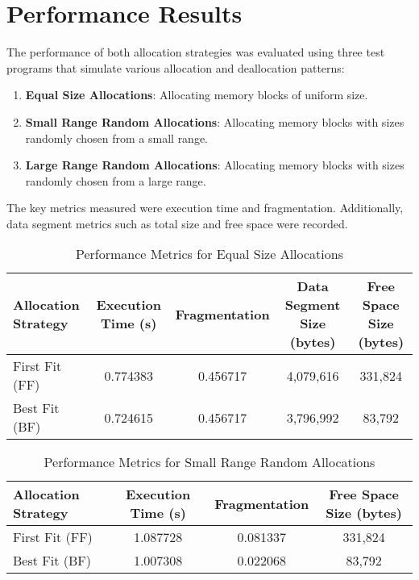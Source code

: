 \documentclass[12pt]{article}
\begin{document}
\section{Performance Results}
The performance of both allocation strategies was evaluated using three test programs that simulate various allocation and deallocation patterns:
\begin{enumerate}
    \item \textbf{Equal Size Allocations}: Allocating memory blocks of uniform size.
    \item \textbf{Small Range Random Allocations}: Allocating memory blocks with sizes randomly chosen from a small range.
    \item \textbf{Large Range Random Allocations}: Allocating memory blocks with sizes randomly chosen from a large range.
\end{enumerate}
The key metrics measured were execution time and fragmentation. Additionally, data segment metrics such as total size and free space were recorded.

\begin{table}[h]
    \centering
    \caption{Performance Metrics for Equal Size Allocations}
    \begin{tabular}{@{}lcccc@{}}
        \toprule
        Allocation Strategy & Execution Time (s) & Fragmentation & Data Segment Size (bytes) & Free Space Size (bytes) \\ \midrule
        First Fit (FF)       & 0.774383            & 0.456717      & 4,079,616                  & 331,824                   \\
        Best Fit (BF)        & 0.724615            & 0.456717      & 3,796,992                  & 83,792                    \\ \bottomrule
    \end{tabular}
    \label{tab:equal_size}
\end{table}

\begin{table}[h]
    \centering
    \caption{Performance Metrics for Small Range Random Allocations}
    \begin{tabular}{@{}lccc@{}}
        \toprule
        Allocation Strategy & Execution Time (s) & Fragmentation & Free Space Size (bytes) \\ \midrule
        First Fit (FF)       & 1.087728            & 0.081337      & 331,824                   \\
        Best Fit (BF)        & 1.007308            & 0.022068      & 83,792                    \\ \bottomrule
    \end{tabular}
    \label{tab:small_range_rand}
\end{table}
\end{document}
